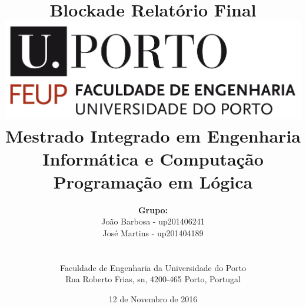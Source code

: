 \documentclass[a4paper]{article}
\begin{document}
\nocite{*}

\setlength{\textwidth}{16cm}
\setlength{\textheight}{22cm}

\title{\Huge\textbf{Blockade}\linebreak\linebreak\linebreak
\Large\textbf{Relatório Final}\linebreak\linebreak
\linebreak\linebreak
\includegraphics[scale=0.1]{feup-logo.png}\linebreak\linebreak
\linebreak\linebreak
\Large{Mestrado Integrado em Engenharia Informática e Computação} \linebreak\linebreak
\Large{Programação em Lógica}\linebreak
}

\author{\textbf{Grupo:}\\  João Barbosa - up201406241 \\ José Martins - up201404189 \\\linebreak\linebreak \\
 \\ Faculdade de Engenharia da Universidade do Porto \\ Rua Roberto Frias, s\/n, 4200-465 Porto, Portugal 
\vspace{1cm}}
\date{12 de Novembro de 2016}
\maketitle
\thispagestyle{empty}

\end{document}
